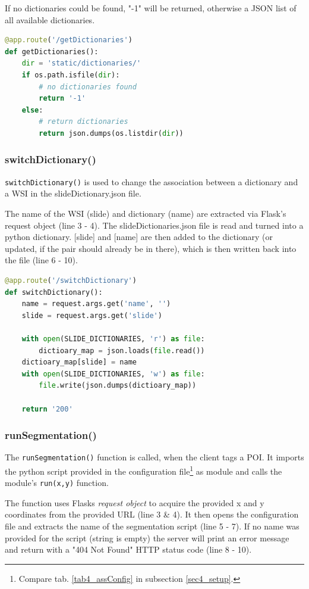 If no dictionaries could be found, "-1" will be returned, otherwise a JSON list of all available dictionaries.

\begin{lstlisting}[language=Python, frame=single]
@app.route('/getDictionaries')
def getDictionaries():
	dir = 'static/dictionaries/'
	if os.path.isfile(dir):
		# no dictionaries found
		return '-1'
	else:
		# return dictionaries
		return json.dumps(os.listdir(dir))
\end{lstlisting}

\subsubsection{switchDictionary()}
\texttt{switchDictionary()} is used to change the association between a dictionary and a WSI in the slideDictionary.json file.

The name of the WSI (slide) and dictionary (name) are extracted via Flask's request object (line 3 - 4). The slideDictionaries.json file is read and turned into a python dictionary. [slide] and [name] are then added to the dictionary (or updated, if the pair should already be in there), which is then written back into the file (line 6 - 10).

\begin{lstlisting}[language=Python, frame=single]
@app.route('/switchDictionary')
def switchDictionary():
	name = request.args.get('name', '')
	slide = request.args.get('slide')
	
	with open(SLIDE_DICTIONARIES, 'r') as file:
		dictioary_map = json.loads(file.read())
	dictioary_map[slide] = name
	with open(SLIDE_DICTIONARIES, 'w') as file:
		file.write(json.dumps(dictioary_map))
	
	return '200'
\end{lstlisting}

\subsubsection{runSegmentation()}
The \texttt{runSegmentation()} function is called, when the client tags a POI. It imports the python script provided in the configuration file\footnote{
	Compare tab. \ref{tab4_assConfig} in subsection \ref{sec4_setup}.
} as module and calls the module's \texttt{run(x,y)} function.

The function uses Flasks \emph{request object} to acquire the provided x and y coordinates from the provided URL (line 3 \& 4). It then opens the configuration file and extracts the name of the segmentation script (line 5 - 7). If no name was provided for the script (string is empty) the server will print an error message and return with a "404 Not Found" HTTP status code (line 8 - 10).

